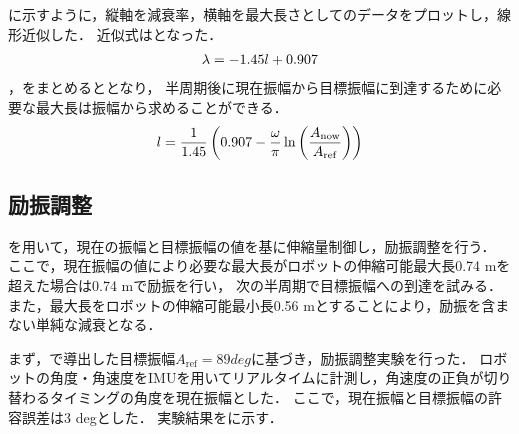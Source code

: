         \figref{}に示すように，縦軸を減衰率，横軸を最大長さとしてのデータをプロットし，線形近似した．
        近似式はとなった．
        \begin{eqnarray}
          \equlabel{length relation}
          \lambda=-1.45l+0.907
        \end{eqnarray}
        ，をまとめるととなり，
        半周期後に現在振幅から目標振幅に到達するために必要な最大長は振幅から求めることができる．
        \begin{eqnarray}
          \equlabel{l status}
          l=\frac{1}{1.45}\left(0.907-\frac{\omega}{\pi}\ln{\left(\frac{A_{\mathrm{now}}}{A_{\mathrm{ref}}}\right)}\right)
        \end{eqnarray}
        

        \subsection{励振調整}
        
        を用いて，現在の振幅と目標振幅の値を基に伸縮量制御し，励振調整を行う．
        ここで，現在振幅の値により必要な最大長がロボットの伸縮可能最大長0.74 mを超えた場合は0.74 mで励振を行い，
        次の半周期で目標振幅への到達を試みる．
        また，最大長をロボットの伸縮可能最小長0.56 mとすることにより，励振を含まない単純な減衰となる．

        まず，で導出した目標振幅$A_{\mathrm{ref}}=89 deg$に基づき，励振調整実験を行った．
        ロボットの角度・角速度をIMUを用いてリアルタイムに計測し，角速度の正負が切り替わるタイミングの角度を現在振幅とした．
        ここで，現在振幅と目標振幅の許容誤差は3 degとした．
        実験結果を\figref{}に示す．





          


